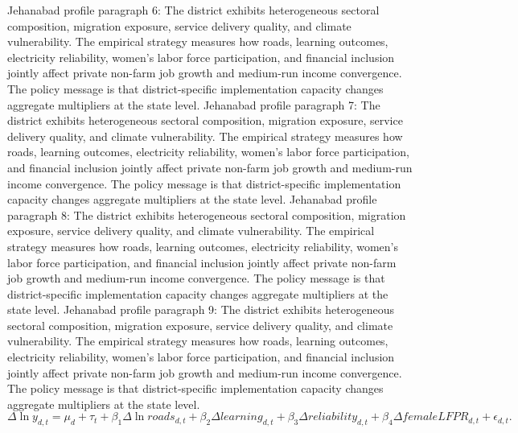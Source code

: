 \documentclass[preprint,12pt]{elsarticle}
\begin{document}
Jehanabad profile paragraph 6: The district exhibits heterogeneous sectoral composition, migration exposure, service delivery quality, and climate vulnerability. The empirical strategy measures how roads, learning outcomes, electricity reliability, women's labor force participation, and financial inclusion jointly affect private non-farm job growth and medium-run income convergence. The policy message is that district-specific implementation capacity changes aggregate multipliers at the state level.
Jehanabad profile paragraph 7: The district exhibits heterogeneous sectoral composition, migration exposure, service delivery quality, and climate vulnerability. The empirical strategy measures how roads, learning outcomes, electricity reliability, women's labor force participation, and financial inclusion jointly affect private non-farm job growth and medium-run income convergence. The policy message is that district-specific implementation capacity changes aggregate multipliers at the state level.
Jehanabad profile paragraph 8: The district exhibits heterogeneous sectoral composition, migration exposure, service delivery quality, and climate vulnerability. The empirical strategy measures how roads, learning outcomes, electricity reliability, women's labor force participation, and financial inclusion jointly affect private non-farm job growth and medium-run income convergence. The policy message is that district-specific implementation capacity changes aggregate multipliers at the state level.
Jehanabad profile paragraph 9: The district exhibits heterogeneous sectoral composition, migration exposure, service delivery quality, and climate vulnerability. The empirical strategy measures how roads, learning outcomes, electricity reliability, women's labor force participation, and financial inclusion jointly affect private non-farm job growth and medium-run income convergence. The policy message is that district-specific implementation capacity changes aggregate multipliers at the state level.
\begin{equation}\Delta \ln y_{d,t}=\mu_d+\tau_t+\beta_1\Delta\ln roads_{d,t}+\beta_2\Delta learning_{d,t}+\beta_3\Delta reliability_{d,t}+\beta_4\Delta femaleLFPR_{d,t}+\epsilon_{d,t}.\end{equation}
\end{document}
